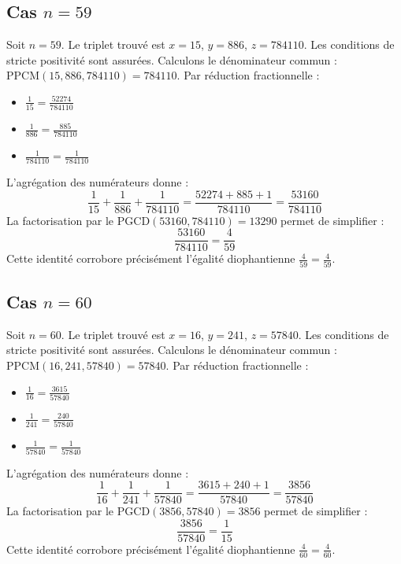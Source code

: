 \documentclass[11pt,a4paper]{article}
\begin{document}
\subsection{Cas $n = 59$}
Soit $n = 59$. Le triplet trouvé est $x = 15$, $y = 886$, $z = 784110$.
Les conditions de stricte positivité sont assurées.
Calculons le dénominateur commun : $\text{PPCM}(15, 886, 784110) = 784110$.
Par réduction fractionnelle :
\begin{itemize}
    \item $\frac{1}{15} = \frac{52274}{784110}$
    \item $\frac{1}{886} = \frac{885}{784110}$
    \item $\frac{1}{784110} = \frac{1}{784110}$
\end{itemize}
L'agrégation des numérateurs donne :
$$ \frac{1}{15} + \frac{1}{886} + \frac{1}{784110} = \frac{52274 + 885 + 1}{784110} = \frac{53160}{784110} $$
La factorisation par le $\text{PGCD}(53160, 784110) = 13290$ permet de simplifier :
$$ \frac{53160}{784110} = \frac{4}{59} $$
Cette identité corrobore précisément l'égalité diophantienne $\frac{4}{59} = \frac{4}{59}$.

\subsection{Cas $n = 60$}
Soit $n = 60$. Le triplet trouvé est $x = 16$, $y = 241$, $z = 57840$.
Les conditions de stricte positivité sont assurées.
Calculons le dénominateur commun : $\text{PPCM}(16, 241, 57840) = 57840$.
Par réduction fractionnelle :
\begin{itemize}
    \item $\frac{1}{16} = \frac{3615}{57840}$
    \item $\frac{1}{241} = \frac{240}{57840}$
    \item $\frac{1}{57840} = \frac{1}{57840}$
\end{itemize}
L'agrégation des numérateurs donne :
$$ \frac{1}{16} + \frac{1}{241} + \frac{1}{57840} = \frac{3615 + 240 + 1}{57840} = \frac{3856}{57840} $$
La factorisation par le $\text{PGCD}(3856, 57840) = 3856$ permet de simplifier :
$$ \frac{3856}{57840} = \frac{1}{15} $$
Cette identité corrobore précisément l'égalité diophantienne $\frac{4}{60} = \frac{4}{60}$.
\end{document}
